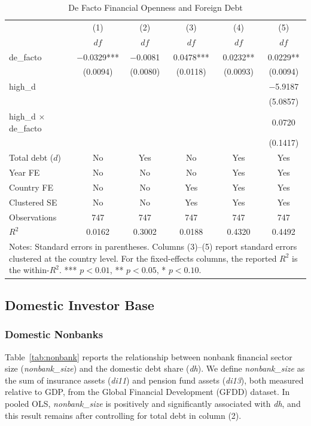 \documentclass[\latexroot/\projectname]{subfiles}
\begin{document}
\begin{table}[htbp]\centering
\caption{De Facto Financial Openness and Foreign Debt}
\label{tab:df_defacto}
\begin{tabular}{lccccc}
\toprule
 & (1) & (2) & (3) & (4) & (5) \\
 & $df$ & $df$ & $df$ & $df$ & $df$ \\
\midrule
de\_facto 
& $-$0.0329*** & $-$0.0081 & 0.0478*** & 0.0232** & 0.0229** \\
& (0.0094) & (0.0080) & (0.0118) & (0.0093) & (0.0094) \\

high\_d
&  &  &  &  & $-$5.9187 \\
&  &  &  &  & (5.0857) \\

high\_d $\times$ de\_facto
&  &  &  &  & 0.0720 \\
&  &  &  &  & (0.1417) \\

\midrule
Total debt ($d$) & No & Yes & No & Yes & Yes \\
Year FE          & No & No  & No & Yes & Yes \\
Country FE       & No & No  & Yes & Yes & Yes \\
Clustered SE     & No & No  & Yes & Yes & Yes \\

\midrule
Observations & 747 & 747 & 747 & 747 & 747 \\
$R^2$        & 0.0162 & 0.3002 & 0.0188 & 0.4320 & 0.4492 \\
\bottomrule
\multicolumn{6}{p{0.92\linewidth}}{\footnotesize Notes: Standard errors in parentheses. Columns (3)--(5) report standard errors clustered at the country level. For the fixed-effects columns, the reported $R^2$ is the within-$R^2$. *** $p<0.01$, ** $p<0.05$, * $p<0.10$.}
\end{tabular}
\end{table}

\subsection{Domestic Investor Base}

\subsubsection{Domestic Nonbanks}

Table~\ref{tab:nonbank} reports the relationship between nonbank financial sector size (\textit{nonbank\_size}) and the domestic debt share (\textit{dh}). We define \textit{nonbank\_size} as the sum of insurance assets (\textit{di11}) and pension fund assets (\textit{di13}), both measured relative to GDP, from the Global Financial Development (GFDD) dataset. In pooled OLS, \textit{nonbank\_size} is positively and significantly associated with \textit{dh}, and this result remains after controlling for total debt in column (2).
\end{document}
